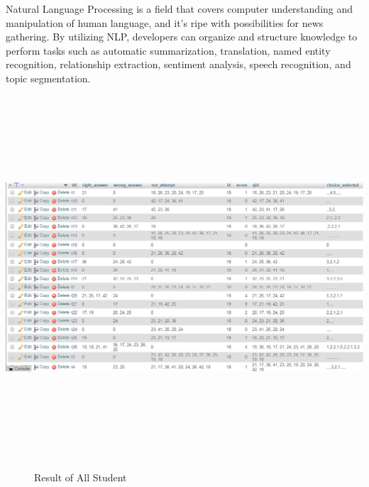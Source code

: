 Natural Language Processing is a field that covers computer understanding and manipulation of human language, and it’s ripe with possibilities for news gathering. By utilizing NLP, developers can organize and structure knowledge to perform tasks such as automatic summarization, translation, named entity recognition, relationship extraction, sentiment analysis, speech recognition, and topic segmentation.
\begin{center}
	\includegraphics[width=13.5cm, height=13.5cm]{result1.png}
	\begin{figure}[h!]
		\centering
		\caption{Result of All Student}%
	\end{figure}
\end{center}
